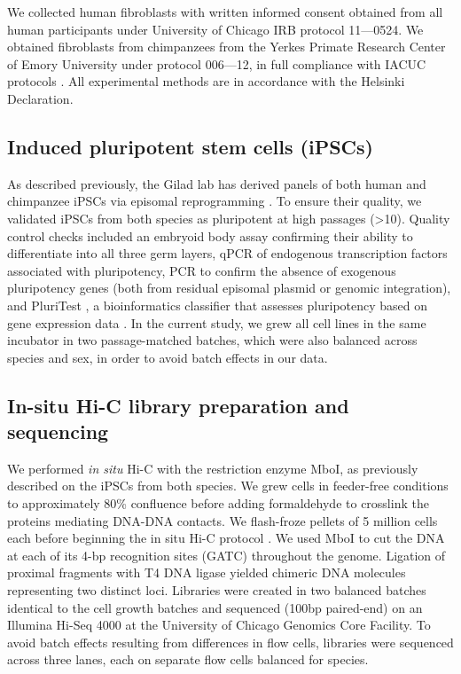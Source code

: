 We collected human fibroblasts with written informed consent obtained from all human participants under University of Chicago IRB protocol 11---0524. We obtained fibroblasts from chimpanzees from the Yerkes Primate Research Center of Emory University under protocol 006---12, in full compliance with IACUC protocols \cite{Romero.2015}. All experimental methods are in accordance with the Helsinki Declaration.

\subsection{Induced pluripotent stem cells (iPSCs)}

As described previously, the Gilad lab has derived panels of both human and chimpanzee iPSCs via episomal reprogramming \cite{Romero.2015}. To ensure their quality, we validated iPSCs from both species as pluripotent at high passages ({\textgreater}10). Quality control checks included an embryoid body assay confirming their ability to differentiate into all three germ layers, qPCR of endogenous transcription factors associated with pluripotency, PCR to confirm the absence of exogenous pluripotency genes (both from residual episomal plasmid or genomic integration), and PluriTest \cite{Muller.2011}, a bioinformatics classifier that assesses pluripotency based on gene expression data \cite{Romero.2015}. In the current study, we grew all cell lines in the same incubator in two passage-matched batches, which were also balanced across species and sex, in order to avoid batch effects in our data.

\subsection{In-situ Hi-C library preparation and sequencing}
We performed \textit{in situ} Hi-C with the restriction enzyme MboI, as previously described \cite{Rao.2014} on the iPSCs from both species. We grew cells in feeder-free conditions \cite{Nakagawa.2014} to approximately 80\% confluence before adding formaldehyde to crosslink the proteins mediating DNA-DNA contacts. We flash-froze pellets of 5 million cells each before beginning the in situ Hi-C protocol \cite{Rao.2014}. We used MboI to cut the DNA at each of its 4-bp recognition sites (GATC) throughout the genome. Ligation of proximal fragments with T4 DNA ligase yielded chimeric DNA molecules representing two distinct loci. Libraries were created in two balanced batches identical to the cell growth batches and sequenced (100bp paired-end) on an Illumina Hi-Seq 4000 at the University of Chicago Genomics Core Facility. To avoid batch effects resulting from differences in flow cells, libraries were sequenced across three lanes, each on separate flow cells balanced for species.

